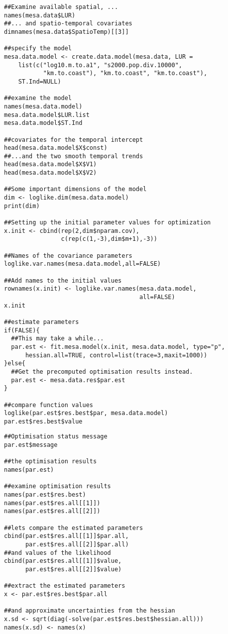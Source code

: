 \begin{verbatim}
##Examine available spatial, ...
names(mesa.data$LUR)
##... and spatio-temporal covariates
dimnames(mesa.data$SpatioTemp)[[3]]

##specify the model
mesa.data.model <- create.data.model(mesa.data, LUR = 
    list(c("log10.m.to.a1", "s2000.pop.div.10000", 
           "km.to.coast"), "km.to.coast", "km.to.coast"), 
    ST.Ind=NULL)

##examine the model
names(mesa.data.model)
mesa.data.model$LUR.list
mesa.data.model$ST.Ind

##covariates for the temporal intercept
head(mesa.data.model$X$const)
##...and the two smooth temporal trends
head(mesa.data.model$X$V1)
head(mesa.data.model$X$V2)

##Some important dimensions of the model
dim <- loglike.dim(mesa.data.model)
print(dim)

##Setting up the initial parameter values for optimization
x.init <- cbind(rep(2,dim$nparam.cov), 
                c(rep(c(1,-3),dim$m+1),-3))

##Names of the covariance parameters
loglike.var.names(mesa.data.model,all=FALSE)

##Add names to the initial values
rownames(x.init) <- loglike.var.names(mesa.data.model,
                                      all=FALSE)
x.init

##estimate parameters
if(FALSE){
  ##This may take a while...
  par.est <- fit.mesa.model(x.init, mesa.data.model, type="p",
      hessian.all=TRUE, control=list(trace=3,maxit=1000))
}else{
  ##Get the precomputed optimisation results instead.
  par.est <- mesa.data.res$par.est
}

##compare function values
loglike(par.est$res.best$par, mesa.data.model)
par.est$res.best$value
\end{verbatim}
\begin{verbatim}
##Optimisation status message
par.est$message

##the optimisation results
names(par.est)

##examine optimisation results
names(par.est$res.best)
names(par.est$res.all[[1]])
names(par.est$res.all[[2]])

##lets compare the estimated parameters
cbind(par.est$res.all[[1]]$par.all,
      par.est$res.all[[2]]$par.all)
##and values of the likelihood
cbind(par.est$res.all[[1]]$value,
      par.est$res.all[[2]]$value)

##extract the estimated parameters
x <- par.est$res.best$par.all

##and approximate uncertainties from the hessian
x.sd <- sqrt(diag(-solve(par.est$res.best$hessian.all)))
names(x.sd) <- names(x)
\end{verbatim}
